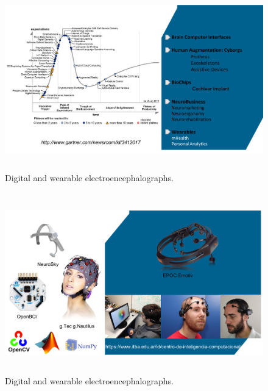 \documentclass[aspectratio=169]{beamer}
\begin{document}
\begin{frame}   
\begin{figure}[]
\centering
\includegraphics[height=7.8cm,width=1\textwidth]{images/hype.png}
\caption[Wearable portable Digital Electroencephalograph]{Digital and wearable electroencephalographs.}
\label{fig:digitalelectroencephalograph}
\end{figure}
\end{frame}

\begin{frame}   
\begin{figure}[]
\centering
\includegraphics[height=7.8cm,width=1\textwidth]{images/Cic.png}
\caption[Wearable portable Digital Electroencephalograph]{Digital and wearable electroencephalographs.}
\label{fig:digitalelectroencephalograph}
\end{figure}
\end{frame}  
\end{document}
